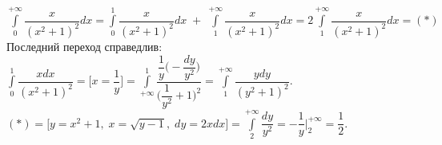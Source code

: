 \documentclass[../main.tex]{subfiles}
\begin{document}
\begin{example}
    
    ~

    \( \displaystyle\int\limits_{ 0}^{ +\infty} \dfrac{ x}{ (x^2+1)^2}dx = 
    \displaystyle\int\limits_{ 0}^{ 1} \dfrac{ x}{ (x^2+1)^2}dx \; + \; \displaystyle\int\limits_{ 1}^{ +\infty} \dfrac{ x}{ (x^2+1)^2}dx =
    2 \displaystyle\int\limits_{ 1}^{ +\infty} \dfrac{ x}{ (x^2+1)^2}dx = (*)\) \\
    \vspace{3mm}
    Последний переход справедлив:
    \( \displaystyle\int\limits_{ 0}^{ 1} \dfrac{ xdx}{ (x^2+1)^2} = \bigg [x = \dfrac{ 1}{ y} \bigg ] = \displaystyle\int\limits_{ +\infty}^{ 1} \dfrac{ \dfrac{ 1}{ y} \bigg (- \dfrac{ dy}{ y^2} \bigg )}{ \bigg ( \dfrac{ 1}{ y^2} + 1 \bigg )^2} = \displaystyle\int\limits_{ 1}^{ +\infty} \dfrac{ ydy}{ (y^2+1)^2}.\)
    \vspace{2mm}
    \( (*) = \bigg [y = x^2+1, \; x = \sqrt{y - 1}, \;dy = 2xdx  \bigg ] = \displaystyle\int\limits_{ 2}^{ +\infty} \dfrac{ dy}{ y^2} = - \dfrac{ 1}{ y} \bigg |^{+\infty}_2 = \dfrac{ 1}{ 2}. \) 
\end{example}
\end{document}
